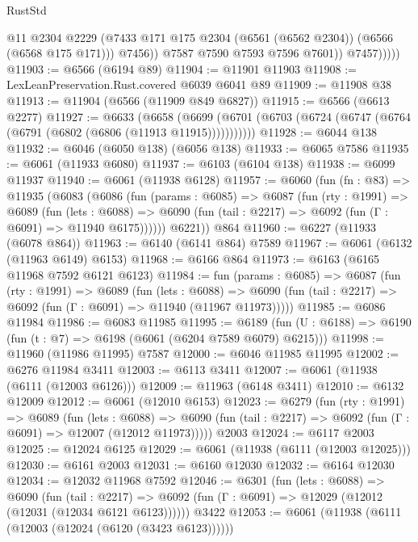 \begin{lexlean}{RustStd}
\begin{coremodule}
                      @11
                      @2304
                      @2229
                      (@7433 @171 @175 @2304 (@6561 (@6562 @2304)) (@6566 (@6568 @175 @171)))
                      @7456))
                  @7587
                  @7590
                  @7593
                  @7596
                  @7601))
              @7457)))))
@11903 := @6566 (@6194 @89)
@11904 := @11901 @11903
@11908 := LexLeanPreservation.Rust.covered @6039 @6041 @89
@11909 := @11908 @38
@11913 := @11904 (@6566 (@11909 @849 @6827))
@11915 := @6566 (@6613 @2277)
@11927 := @6633
    (@6658 (@6699 (@6701 (@6703 (@6724 (@6747 (@6764 (@6791 (@6802 (@6806 (@11913 @11915)))))))))))
@11928 := @6044 @138
@11932 := @6046 (@6050 @138) (@6056 @138)
@11933 := @6065 @7586
@11935 := @6061 (@11933 @6080)
@11937 := @6103 (@6104 @138)
@11938 := @6099 @11937
@11940 := @6061 (@11938 @6128)
@11957 := @6060
    (fun (fn : @83) =>
    @11935
      (@6083
        (@6086
          (fun (params : @6085) =>
          @6087
            (fun (rty : @1991) =>
            @6089
              (fun (lets : @6088) =>
              @6090 (fun (tail : @2217) => @6092 (fun (Γ : @6091) => @11940 @6175))))))
        @6221))
    @864
@11960 := @6227 (@11933 (@6078 @864))
@11963 := @6140 (@6141 @864) @7589
@11967 := @6061 (@6132 (@11963 @6149) @6153)
@11968 := @6166 @864
@11973 := @6163 (@6165 @11968 @7592 @6121 @6123)
@11984 := fun (params : @6085) =>
  @6087
    (fun (rty : @1991) =>
    @6089
      (fun (lets : @6088) =>
      @6090 (fun (tail : @2217) => @6092 (fun (Γ : @6091) => @11940 (@11967 @11973)))))
@11985 := @6086 @11984
@11986 := @6083 @11985
@11995 := @6189 (fun (U : @6188) => @6190 (fun (t : @7) => @6198 (@6061 (@6204 @7589 @6079) @6215)))
@11998 := @11960 (@11986 @11995) @7587
@12000 := @6046 @11985 @11995
@12002 := @6276 @11984 @3411
@12003 := @6113 @3411
@12007 := @6061 (@11938 (@6111 (@12003 @6126)))
@12009 := @11963 (@6148 @3411)
@12010 := @6132 @12009
@12012 := @6061 (@12010 @6153)
@12023 := @6279
    (fun (rty : @1991) =>
    @6089
      (fun (lets : @6088) =>
      @6090 (fun (tail : @2217) => @6092 (fun (Γ : @6091) => @12007 (@12012 @11973)))))
    @2003
@12024 := @6117 @2003
@12025 := @12024 @6125
@12029 := @6061 (@11938 (@6111 (@12003 @12025)))
@12030 := @6161 @2003
@12031 := @6160 @12030
@12032 := @6164 @12030
@12034 := @12032 @11968 @7592
@12046 := @6301
    (fun (lets : @6088) =>
    @6090
      (fun (tail : @2217) =>
      @6092 (fun (Γ : @6091) => @12029 (@12012 (@12031 (@12034 @6121 @6123))))))
    @3422
@12053 := @6061 (@11938 (@6111 (@12003 (@12024 (@6120 (@3423 @6123))))))

\end{coremodule}
\end{lexlean}
